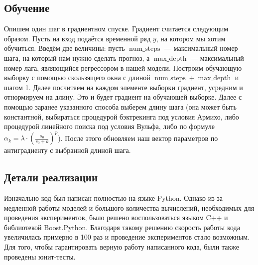 \documentclass[a4paper,14pt]{extarticle}
\begin{document}
	\subsection{Обучение}
	Опишем один шаг в градиентном спуске. Градиент считается следующим образом. Пусть на вход подаётся временной ряд $y$, на котором мы хотим обучиться. Введём две величины: пусть $\operatorname{num\_steps}$ --- максимальный номер шага, на который нам нужно сделать прогноз, а $\operatorname{max\_depth}$ --- максимальный номер лага, являющийся регрессором в нашей модели. Построим обучающую выборку с помощью скользящего окна с длиной $\operatorname{num\_steps} + \operatorname{max\_depth}$ и шагом 1. Далее посчитаем на каждом элементе выборки градиент, усредним и отнормируем на длину. Это и будет градиент на обучающей выборке. Далее с помощью заранее указанного способа выберем длину шага (она может быть константной, выбираться процедурой бэктрекинга под условия Армихо, либо процедурой линейного поиска под условия Вульфа, либо по формуле $\alpha_k = \lambda \cdot \left( \frac{s_0}{s_0 + k} \right)^p$). После этого обновляем наш вектор параметров по антиградиенту с выбранной длиной шага.
	\subsection{Детали реализации}
	Изначально код был написан полностью на языке Python. Однако из-за медленной работы моделей и большого количества вычислений, необходимых для проведения экспериментов, было решено воспользоваться языком C++ и библиотекой Boost.Python. Благодаря такому решению скорость работы кода увеличилась примерно в 100 раз и проведение экспериментов стало возможным. Для того, чтобы гарантировать верную работу написанного кода, были также проведены юнит-тесты.
\end{document}

